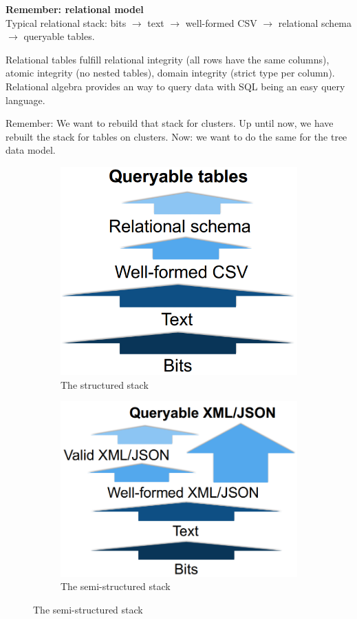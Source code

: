 \documentclass[11pt,oneside,a4paper]{article}
\begin{document}
\textbf{Remember: relational model}\\
Typical relational stack: bits $\rightarrow$ text $\rightarrow$ well-formed CSV $\rightarrow$ relational schema $\rightarrow$ queryable tables.

Relational tables fulfill relational integrity (all rows have the same columns), atomic integrity (no nested tables), domain integrity (strict type per column). Relational algebra provides an way to query data with SQL being an easy query language.

Remember: We want to rebuild that stack for clusters. Up until now, we have rebuilt the stack for tables on clusters. Now: we want to do the same for the tree data model.

\begin{figure}[hb!]
	\centering
	\begin{subfigure}[t]{.3\textwidth}
		\centering
		\includegraphics[width=0.6\linewidth]{figures/docstores_structured_stack}
		\caption{The structured stack}
	\end{subfigure}%
	\begin{subfigure}[t]{.3\textwidth}
		\centering
		\includegraphics[width=0.6\linewidth]{figures/docstores_semistructured_stack}
		\caption{The semi-structured stack}
	\end{subfigure}

\end{figure}
\end{document}
